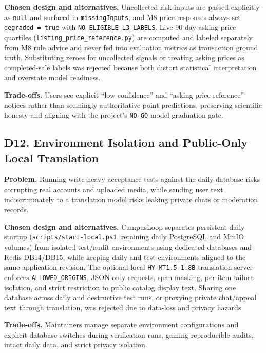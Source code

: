 \textbf{Chosen design and alternatives.} Uncollected risk inputs are passed explicitly as \texttt{null} and surfaced in \texttt{missingInputs}, and M8 price responses always set \texttt{degraded = true} with \texttt{NO\_ELIGIBLE\_\allowbreak L3\_LABELS}. Live 90-day asking-price quartiles (\texttt{listing\_price\_\allowbreak reference.py}) are computed and labeled separately from M8 rule advice and never fed into evaluation metrics as transaction ground truth. Substituting zeroes for uncollected signals or treating asking prices as completed-sale labels was rejected because both distort statistical interpretation and overstate model readiness.

\textbf{Trade-offs.} Users see explicit ``low confidence'' and ``asking-price reference'' notices rather than seemingly authoritative point predictions, preserving scientific honesty and aligning with the project's \texttt{NO-GO} model graduation gate.

\subsection{D12. Environment Isolation and Public-Only Local Translation}

\textbf{Problem.} Running write-heavy acceptance tests against the daily database risks corrupting real accounts and uploaded media, while sending user text indiscriminately to a translation model risks leaking private chats or moderation records.

\textbf{Chosen design and alternatives.} CampusLoop separates persistent daily startup (\texttt{scripts/start-local.ps1}, retaining daily PostgreSQL and MinIO volumes) from isolated test/audit environments using dedicated databases and Redis DB14/DB15, while keeping daily and test environments aligned to the same application revision. The optional local \texttt{HY-MT1.5-1.8B} translation server enforces \texttt{ALLOWED\_ORIGINS}, JSON-only requests, span masking, per-item failure isolation, and strict restriction to public catalog display text. Sharing one database across daily and destructive test runs, or proxying private chat/appeal text through translation, was rejected due to data-loss and privacy hazards.

\textbf{Trade-offs.} Maintainers manage separate environment configurations and explicit database switches during verification runs, gaining reproducible audits, intact daily data, and strict privacy isolation.
